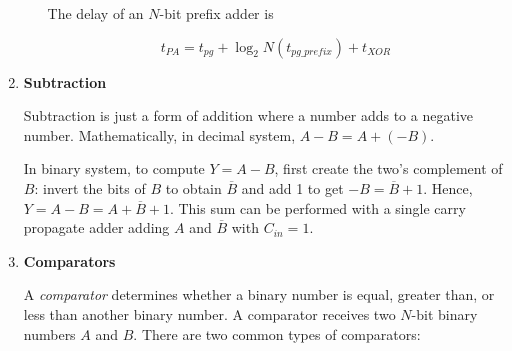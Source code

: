 \documentclass[12pt]{article}
\numberwithin{figure}{subsection}
\numberwithin{table}{subsection}
\numberwithin{equation}{subsection}
\begin{document}
\begin{enumerate}
\begin{enumerate}
    The delay of an $N$-bit prefix adder is

    \begin{equation} \label{equation:1.2.6}
      t_{PA} = t_{pg} + \log_2{N \left( t_{pg\_prefix} \right)} + t_{XOR}
    \end{equation}
  \end{enumerate}

  \item \textbf{Subtraction}

  Subtraction is just a form of addition where a number adds to a negative number. Mathematically, in decimal system, $A - B = A + \left( -B \right)$.

  In binary system, to compute $Y = A - B$, first create the two's complement of $B$: invert the bits of $B$ to obtain $\overline{B}$ and add 1 to get $-B = \overline{B} + 1$. Hence, $Y = A - B = A + \overline{B} + 1$. This sum can be performed with a single carry propagate adder adding $A$ and $\overline{B}$ with $C_{in} = 1$.

  \item \textbf{Comparators}

  A \textit{comparator} determines whether a binary number is equal, greater than, or less than another binary number. A comparator receives two $N$-bit binary numbers $A$ and $B$. There are two common types of comparators:


\end{enumerate}
\end{document}
